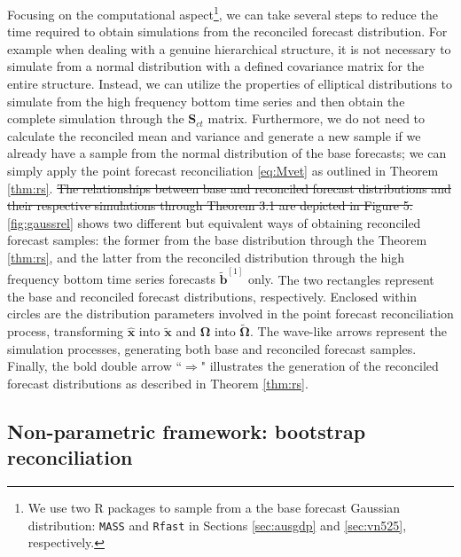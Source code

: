 \documentclass[review, 11pt]{elsarticle}
\newcommand{\bvet}{\bm{b}}
\newcommand{\xvet}{\bm{x}}
\newcommand{\Svet}{\bm{S}}
\newcommand{\Omegavet}{\bm{\Omega}}
\theoremstyle{definition}
\begin{document}
Focusing on the computational aspect\footnote{We use two R packages to sample from a the base forecast Gaussian distribution: \texttt{MASS} \citep{mass2002} and \texttt{Rfast} \citep{rfast2022} in Sections \ref{sec:ausgdp} and \ref{sec:vn525}, respectively.}, we can take several steps to reduce the time required to obtain simulations from the reconciled forecast distribution. For example when dealing with a genuine hierarchical structure, it is not necessary to simulate from a normal distribution with a defined covariance matrix for the entire structure. Instead, we can utilize the properties of elliptical distributions to simulate from the high frequency bottom time series and then obtain the complete simulation through the $\Svet_{ct}$ matrix. Furthermore, we do not need to calculate the reconciled mean and variance and generate a new sample if we already have a sample from the normal distribution of the base forecasts; we can simply apply the point forecast reconciliation \eqref{eq:Mvet} as outlined in Theorem \ref{thm:rs}. 
{\color{red}\sout{The relationships between base and reconciled forecast distributions and their respective simulations through Theorem 3.1 are depicted in Figure 5.}}
{\color{blue}\autoref{fig:gaussrel} shows two different but equivalent ways of obtaining reconciled forecast samples: the former from the base distribution through the Theorem \ref{thm:rs}, and the latter from the reconciled distribution through the high frequency bottom time series forecasts $\widetilde{\bvet}^{[1]}$ only.}
The two rectangles represent the base and reconciled forecast distributions, respectively. Enclosed within circles are the distribution parameters involved in the point forecast reconciliation process, transforming $\widehat{\xvet}$ into $\widetilde{\xvet}$ and $\Omegavet$ into $\widetilde{\Omegavet}$. The wave-like arrows represent the simulation processes, generating both base and reconciled forecast samples. Finally, the bold double arrow “$\Rightarrow$" illustrates the generation of the reconciled forecast distributions as described in Theorem \ref{thm:rs}.


\subsection{Non-parametric framework: bootstrap reconciliation}\label{ssec:boot}
\end{document}
